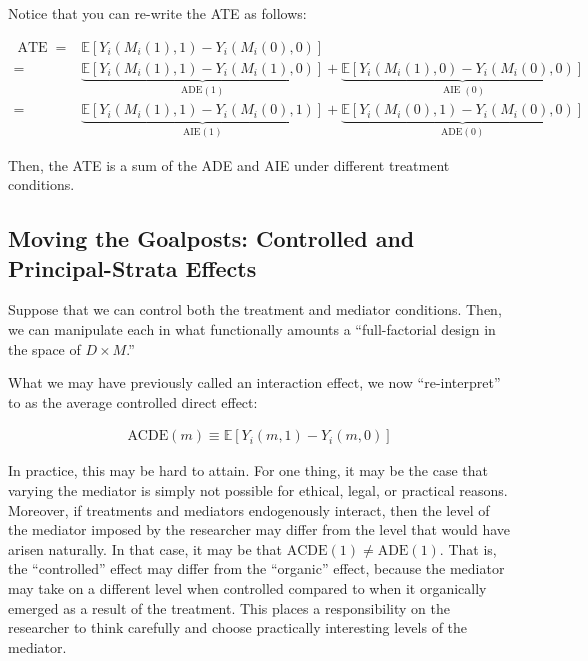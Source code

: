 \documentclass[10pt]{article}
\begin{document}
Notice that you can re-write the ATE as follows:

\begin{align}
        \operatorname{ATE}=&\mathbb{E}\left[Y_i\left(M_i(1), 1\right)-Y_i\left(M_i(0), 0\right)\right] \label{eq:ATE_ex1} \\
        = &\underbrace{\mathbb{E}\left[Y_i\left(M_i(1), 1\right)-Y_i\left(M_i(1), 0\right)\right]}_{\text{ADE}(1)}+\underbrace{\mathbb{E}\left[Y_i\left(M_i(1), 0\right)-Y_i\left(M_i(0), 0\right)\right]}_{\operatorname{AIE}(0)} \label{eq:ATE_ex2} \\
        = &\underbrace{\mathbb{E}\left[Y_i\left(M_i(1), 1\right)-Y_i\left(M_i(0), 1\right)\right]}_{\text{AIE}(1)}+\underbrace{\mathbb{E}\left[Y_i\left(M_i(0), 1\right)-Y_i\left(M_i(0), 0\right)\right]}_{\text{ADE}(0)} \label{eq:ATE_ex3}
\end{align}

Then, the ATE is a sum of the ADE and AIE under different 
treatment conditions.

\subsection{Moving the Goalposts: Controlled and Principal-Strata Effects}

Suppose that we can control both the treatment 
and mediator conditions. Then, we can manipulate each 
in what functionally amounts a 
``full-factorial design in the space of $D \times M$.''

\begin{definition} 
    What we may have previously called an interaction effect, 
    we now ``re-interpret'' to as the average controlled direct effect:

    \begin{align}
        \text{ACDE}(m) \equiv \mathbb{E}\left[Y_i(m, 1)-Y_i(m, 0)\right]
    \end{align}

\end{definition}

In practice, this may be hard to attain. 
For one thing, it may be the case that varying the mediator 
is simply not possible for ethical, legal, or practical reasons.
Moreover, if treatments and mediators endogenously interact, 
then the level of the mediator imposed by the researcher may differ
from the level that would have arisen naturally. 
In that case, it may be that $\text{ACDE}(1) \neq \text{ADE}(1)$.
That is, the ``controlled'' effect may differ from the ``organic'' effect,
because the mediator may take on a different level when controlled 
compared to when it organically emerged as a result of the treatment.
This places a responsibility on the researcher to think carefully 
and choose practically interesting levels of the mediator.
\end{document}
